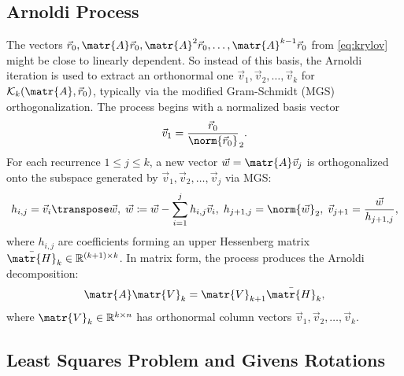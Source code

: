 \subsection{Arnoldi Process}
\label{sec:arnoldi-process}

The vectors \(\vec{r}_0, \matr{A}\vec{r}_0, \matr{A}^2\vec{r}_0, \dots, \matr{A}^{k - 1}\vec{r}_0\) from
\eqref{eq:krylov} might be close to linearly dependent. So instead of this
basis, the Arnoldi iteration is used to extract an orthonormal one \(\vec{v}_1,
\vec{v}_2, \dots, \vec{v}_k\) for \(\mathcal{K}_k(\matr{A}, \vec{r}_0)\),
typically via the modified Gram-Schmidt (MGS) orthogonalization. The process
begins with a normalized basis vector \[\vec{v}_1 =
  \frac{\vec{r}_0}{\norm{\vec{r}_0}}_2.\] For each recurrence \(1 \le j \le k\),
a new vector \(\vec{w} = \matr{A} \vec{v}_j\) is orthogonalized onto the
subspace generated by \(\vec{v}_1, \vec{v}_2, \dots, \vec{v}_j\) via MGS:
\[h_{i,j} = \vec{v}_i\transpose \vec{w},\;\vec{w} \coloneq \vec{w} - \sum_{i = 1}^{j} h_{i,j}\vec{v}_i,\; h_{j+1,j} =
  \norm{\vec{w}}_2,\; \vec{v}_{j+1} = \frac{\vec{w}}{h_{j+1,j}},\] where
\(h_{i,j}\) are coefficients forming an upper Hessenberg matrix
\(\bar{\matr{H}}_k \in \mathbb{R}^{(k+1) \times k}\). In matrix form, the
process produces the Arnoldi decomposition:
\begin{equation}
  \label{eq:arnoldi}
  \matr{A}\matr{V}_k = \matr{V}_{k+1} \bar{\matr{H}}_k,
\end{equation}
where \(\matr{V}_{k} \in \mathbb{R}^{k \times n}\) has orthonormal column vectors
\(\vec{v}_1, \vec{v}_2, \dots, \vec{v}_k\).

\subsection{Least Squares Problem and Givens Rotations}
\label{sec:givens-rotat-least}

